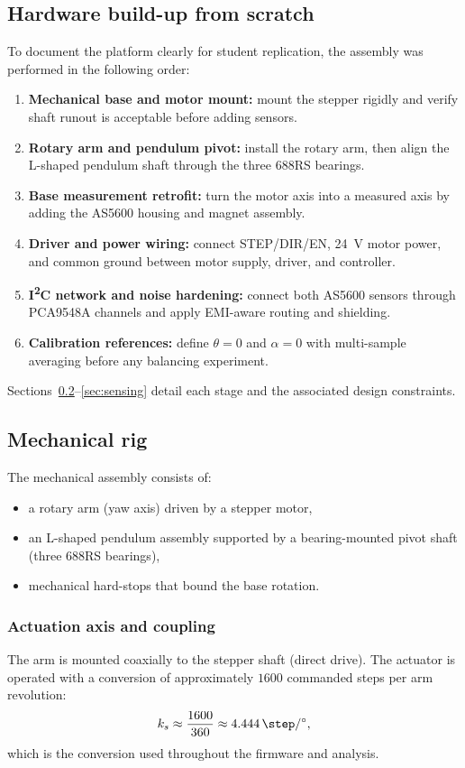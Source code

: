 \subsection{Hardware build-up from scratch}
\label{sec:hardware_build}
To document the platform clearly for student replication, the assembly was performed in the following order:
\begin{enumerate}
  \item \textbf{Mechanical base and motor mount:} mount the stepper rigidly and verify shaft runout is acceptable before adding sensors.
  \item \textbf{Rotary arm and pendulum pivot:} install the rotary arm, then align the L-shaped pendulum shaft through the three 688RS bearings.
  \item \textbf{Base measurement retrofit:} turn the motor axis into a measured axis by adding the AS5600 housing and magnet assembly.
  \item \textbf{Driver and power wiring:} connect STEP/DIR/EN, \SI{24}{V} motor power, and common ground between motor supply, driver, and controller.
  \item \textbf{I\textsuperscript{2}C network and noise hardening:} connect both AS5600 sensors through PCA9548A channels and apply EMI-aware routing and shielding.
  \item \textbf{Calibration references:} define $\theta=0$ and $\alpha=0$ with multi-sample averaging before any balancing experiment.
\end{enumerate}
Sections~\ref{sec:mechanical_rig}--\ref{sec:sensing} detail each stage and the associated design constraints.

\subsection{Mechanical rig}
\label{sec:mechanical_rig}
The mechanical assembly consists of:
\begin{itemize}
  \item a rotary arm (yaw axis) driven by a stepper motor,
  \item an L-shaped pendulum assembly supported by a bearing-mounted pivot shaft (three 688RS bearings),
  \item mechanical hard-stops that bound the base rotation.
\end{itemize}

\subsubsection*{Actuation axis and coupling}
The arm is mounted coaxially to the stepper shaft (direct drive). The actuator is operated with a conversion of approximately $1600$ commanded steps per arm revolution:
\[
k_s \approx \frac{1600}{360} \approx \SI{4.444}{\step\per\degree},
\]
which is the conversion used throughout the firmware and analysis.

